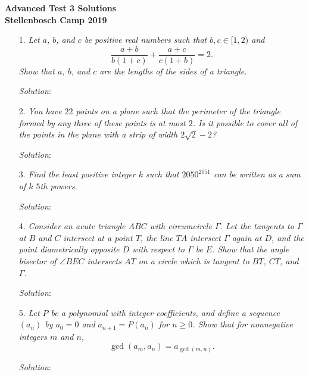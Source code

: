 \documentclass{article}
\begin{document}
\begin{center}
  \textbf{\Large Advanced Test 3 Solutions}
  \\ \vspace{1em}
  \textbf{\large Stellenbosch Camp 2019}
\end{center}

\vspace{12pt}


\begin{enumerate}

\item[1.] %
{\itshape
Let $a$, $b$, and $c$ be positive real numbers such that $b, c \in [1,2)$ and
\[ \frac{a+b}{b(1+c)} +\frac{a+c}{c(1+b)} = 2. \]
Show that $a$, $b$, and $c$ are the lengths of the sides of a triangle. 
}

\textit{Solution}:


\item[2.] %
{\itshape
You have $22$ points on a plane such that the perimeter of the triangle formed by any three of these points is at most $2$. Is it possible to cover all of the points in the plane with a strip of width $2\sqrt{2} - 2$?
}

\textit{Solution}:


\item[3.] %
{\itshape
Find the least positive integer $k$ such that $2050^{2051}$ can be written as a sum of $k$ $5$th powers.
}

\textit{Solution}:


\item[4.] %
{\itshape
Consider an acute triangle $ABC$ with circumcircle $\Gamma$.
Let the tangents to $\Gamma$ at $B$ and $C$ intersect at a point $T$, the line $TA$ intersect $\Gamma$ again at $D$, and the point diametrically opposite $D$ with respect to $\Gamma$ be $E$.
Show that the angle bisector of $\angle BEC$ intersects $AT$ on a circle which is tangent to $BT$, $CT$, and $\Gamma$.
}

\textit{Solution}:


\item[5.] %
{\itshape
Let $P$ be a polynomial with integer coefficients, and define a sequence $(a_n)$ by $a_0 = 0$ and $a_{n+1} = P(a_n)$ for $n \geq 0$.
Show that for nonnegative integers $m$ and $n$,
\[ \gcd(a_m,a_n) = a_{\gcd(m,n)}. \]
}

\textit{Solution}:


\end{enumerate}
\end{document}
